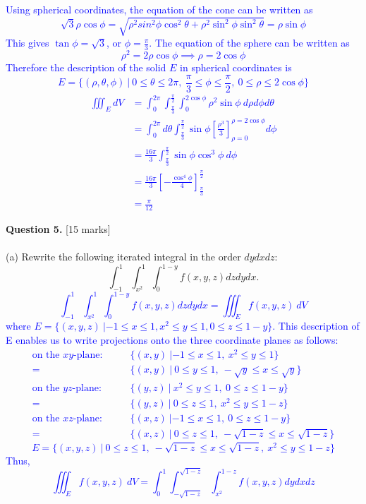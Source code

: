\documentclass[12pt]{article}
\begin{document}
\textcolor{blue}{
Using spherical coordinates, the equation of the cone can be written as
\[
\sqrt{3}\rho\cos\phi=\sqrt{\rho^2sin^2\phi\cos^2\theta+\rho^2\sin^2\phi\sin^2\theta}=\rho\sin\phi
\]
This gives $\tan\phi=\sqrt{3}$, or $\phi=\frac{\pi}{3}$. The equation of the sphere can be written as
\[
\rho^2=2\rho\cos\phi\implies\rho=2\cos\phi
\]
Therefore the description of the solid $E$ in spherical coordinates is
\[
E=\{(\rho,\theta,\phi)\ |\ 0\leq\theta\leq 2\pi,\ \frac{\pi}{3}\leq\phi\leq\frac{\pi}{2},\ 0\leq\rho\leq2\cos\phi\}
\]
\begin{align*}
	\iiint_EdV&=\int_{0}^{2\pi}\int_{\frac{\pi}{3}}^{\frac{\pi}{2}}\int_{0}^{2\cos\phi}\rho^2\sin\phi\ d\rho d\phi d\theta\\
	&=\int_{0}^{2\pi}d\theta\int_{\frac{\pi}{3}}^{\frac{\pi}{2}}\sin\phi\left[\frac{\rho^3}{3}\right]_{\rho=0}^{\rho=2\cos\phi}d\phi\\
	&=\frac{16\pi}{3}\int_{\frac{\pi}{3}}^{\frac{\pi}{2}}\sin\phi\cos^3\phi\ d\phi\\
	&=\frac{16\pi}{3}\left[-\frac{\cos^4\phi}{4}\right]_{\frac{\pi}{3}}^{\frac{\pi}{2}}\\
	&=\frac{\pi}{12}
\end{align*}
}


{\bf Question 5.} [15 marks]\\
\\\indent
(a) Rewrite the following iterated integral in the order $dydxdz$:
\[
\int_{-1}^{1}\int_{x^2}^{1}\int_{0}^{1-y}f(x,y,z)dzdydx.
\]
\textcolor{blue}{
\[
\int_{-1}^{1}\int_{x^2}^{1}\int_{0}^{1-y}f(x,y,z)dzdydx=\iiint_E f(x,y,z)\ dV
\]
where $E=\{(x,y,z)\ |-1\leq x\leq1,x^2\leq y\leq 1,0\leq z\leq 1-y\}$. This description of E enables us to write projections onto the three coordinate planes as follows: \begin{align*}
	\text{on the }xy\text{-plane:}\qquad &\{(x,y)\ |-1\leq x\leq1,\ x^2\leq y\leq1\}\\
	=&\{(x,y)\ |\ 0\leq y\leq1,\ -\sqrt{y}\leq x\leq\sqrt{y}\}\\
	\text{on the }yz\text{-plane:}\qquad &\{(y,z)\ |\ x^2\leq y\leq1,\ 0\leq z\leq1-y\}\\
	=&\{(y,z)\ |\ 0\leq z\leq1,\ x^2\leq y\leq1-z\}\\
	\text{on the }xz\text{-plane:}\qquad &\{(x,z)\ |-1\leq x\leq1,\ 0\leq z\leq1-y\}\\
	=&\{(x,z)\ |\ 0\leq z\leq1,\ -\sqrt{1-z}\leq x\leq\sqrt{1-z}\}
\end{align*}
\[
E=\{(x,y,z)\ |\ 0\leq z\leq1,\ -\sqrt{1-z}\leq x\leq\sqrt{1-z},\ x^2\leq y\leq1-z\}
\]
Thus,
\[
\iiint_E f(x,y,z)\ dV=\int_0^1\int_{-\sqrt{1-z}}^{\sqrt{1-z}}\int_{x^2}^{1-z}f(x,y,z)dydxdz
\]\\}
\end{document}
